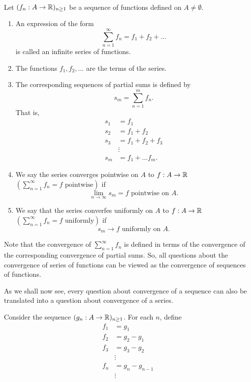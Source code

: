 \begin{definition} \leavevmode \\
    Let $(f_n: A \to \mathbb{R})_{n \geq 1}$ be a sequence of functions defined on $A \neq \emptyset.$
    \begin{enumerate}
        \item An expression of the form
        \[\sum_{n=1}^\infty f_n = f_1 + f_2 + ...\]
        is called an infinite series of functions.

        \item The functions $f_1, f_2, ...$ are the terms of the series.
        \item The corresponding sequences of partial sums is defined by 
        \[s_m = \sum_{n=1}^m f_n.\]
        That is,
        \begin{align*}
            s_1 &= f_1 \\
            s_2 &= f_1 + f_2 \\
            s_3 &= f_1 + f_2 + f_3 \\
            &\vdots \\
            s_m &= f_1 + ... f_m.
        \end{align*}
        \item We say the series converges pointwise on $A$ to $f:A \to \mathbb{R}$ $\left(\sum \limits_{n=1}^\infty f_n = f \text{ pointwise}\right)$ if 
        \[\lim \limits_{n\to \infty}s_m = f \text{ pointwise on } A.\]
        \item We say that the series converfes uniformly on $A$ to $f: A \to \mathbb{R}$ $\left(\sum \limits_{n=1}^\infty f_n = f \text{ uniformly}\right)$ if 
        \[s_m \to f \text{ uniformly on } A.\]
    \end{enumerate}
\end{definition}

\begin{observation}
    Note that the convergence of $\sum \limits_{n=1}^\infty f_n$ is defined in terms of the convergence of the corresponding convergence of partial sums. So, all questions about the convergence of series of functions can be viewed as the convergence of sequences of functions.

    As we shall now see, every question about convergence of a sequence can also be translated into a question about convergence of a series.
\end{observation}

Consider the sequence $(g_n: A \to \mathbb{R})_{n\geq 1}$. For each $n$, define
\begin{align*}
    f_1 &= g_1 \\
    f_2 &= g_2 - g_1 \\
    f_3 &= g_3 - g_2 \\
    &\vdots \\
    f_n &= g_n - g_{n-1} \\
    &\vdots
\end{align*}


